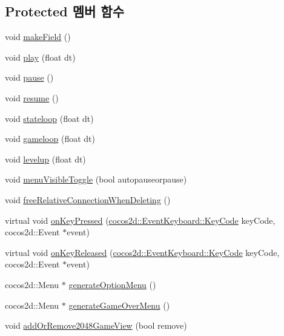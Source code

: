 \subsection*{Protected 멤버 함수}
\begin{DoxyCompactItemize}
\item 
void \hyperlink{class_hello_world_ac7cca1564e8be641f0d52b97040c0a69}{make\+Field} ()
\item 
void \hyperlink{class_hello_world_ac1aee383de0a7c30e84f7efc0da8d944}{play} (float dt)
\item 
void \hyperlink{class_hello_world_af72bece97d2fe997936df92723636298}{pause} ()
\item 
void \hyperlink{class_hello_world_ad72b45627fe36ea8cd04b9de431edc7f}{resume} ()
\item 
void \hyperlink{class_hello_world_a4ab71b15b7e362af143d2a539e39a538}{stateloop} (float dt)
\item 
void \hyperlink{class_hello_world_af59f38fb445c1302e5d2f7e18d0ab0e5}{gameloop} (float dt)
\item 
void \hyperlink{class_hello_world_af1590254503ba391a084d767df2dd858}{levelup} (float dt)
\item 
void \hyperlink{class_hello_world_a38047ef68d46872dd39be5d4cc59ad18}{menu\+Visible\+Toggle} (bool autopauseorpause)
\item 
void \hyperlink{class_hello_world_ab2e9dbd1b003e6d26a10a76495efcc2a}{free\+Relative\+Connection\+When\+Deleting} ()
\item 
virtual void \hyperlink{class_hello_world_af2d5a509259a5d0fce7770a38df371d3}{on\+Key\+Pressed} (\hyperlink{_hello_world_scene_8cpp_a29d93764040e709187aa17656a43405d}{cocos2d\+::\+Event\+Keyboard\+::\+Key\+Code} key\+Code, cocos2d\+::\+Event $\ast$event)
\item 
virtual void \hyperlink{class_hello_world_acb7b8934f4697e752182a650a1dc7c3a}{on\+Key\+Released} (\hyperlink{_hello_world_scene_8cpp_a29d93764040e709187aa17656a43405d}{cocos2d\+::\+Event\+Keyboard\+::\+Key\+Code} key\+Code, cocos2d\+::\+Event $\ast$event)
\item 
cocos2d\+::\+Menu $\ast$ \hyperlink{class_hello_world_a24162678657656105f59887233f9c841}{generate\+Option\+Menu} ()
\item 
cocos2d\+::\+Menu $\ast$ \hyperlink{class_hello_world_a7b22f04ccc721e47e59c4f5470768790}{generate\+Game\+Over\+Menu} ()
\item 
void \hyperlink{class_hello_world_ad3ea29ba5aa294fc4e4f8ee41833b702}{add\+Or\+Remove2048\+Game\+View} (bool remove)

\end{DoxyCompactItemize}
